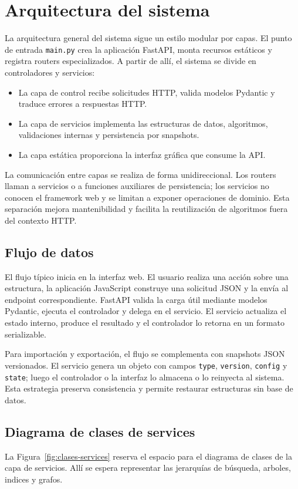 \documentclass[12pt,onecolumn]{IEEEtran}
\begin{document}
\section{Arquitectura del sistema}
La arquitectura general del sistema sigue un estilo modular por capas. El punto de entrada \texttt{main.py} crea la aplicación FastAPI, monta recursos estáticos y registra routers especializados. A partir de allí, el sistema se divide en controladores y servicios:

\begin{itemize}
  \item La capa de control recibe solicitudes HTTP, valida modelos Pydantic y traduce errores a respuestas HTTP.
  \item La capa de servicios implementa las estructuras de datos, algoritmos, validaciones internas y persistencia por snapshots.
  \item La capa estática proporciona la interfaz gráfica que consume la API.
\end{itemize}

La comunicación entre capas se realiza de forma unidireccional. Los routers llaman a servicios o a funciones auxiliares de persistencia; los servicios no conocen el framework web y se limitan a exponer operaciones de dominio. Esta separación mejora mantenibilidad y facilita la reutilización de algoritmos fuera del contexto HTTP.

\subsection{Flujo de datos}
El flujo típico inicia en la interfaz web. El usuario realiza una acción sobre una estructura, la aplicación JavaScript construye una solicitud JSON y la envía al endpoint correspondiente. FastAPI valida la carga útil mediante modelos Pydantic, ejecuta el controlador y delega en el servicio. El servicio actualiza el estado interno, produce el resultado y el controlador lo retorna en un formato serializable.

Para importación y exportación, el flujo se complementa con snapshots JSON versionados. El servicio genera un objeto con campos \texttt{type}, \texttt{version}, \texttt{config} y \texttt{state}; luego el controlador o la interfaz lo almacena o lo reinyecta al sistema. Esta estrategia preserva consistencia y permite restaurar estructuras sin base de datos.

\subsection{Diagrama de clases de services}
La Figura~\ref{fig:clases-services} reserva el espacio para el diagrama de clases de la capa de servicios. Allí se espera representar las jerarquías de búsqueda, arboles, indices y grafos.
\end{document}
